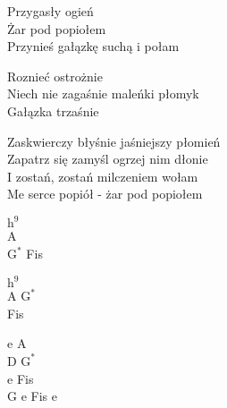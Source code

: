 \begin{text}
    Przygasły ogień\\
    Żar pod popiołem\\
    Przynieś gałązkę suchą i połam

    Roznieć ostrożnie\\
    Niech nie zagaśnie maleńki płomyk\\
    Gałązka trzaśnie

    Zaskwierczy błyśnie jaśniejszy płomień\\
    Zapatrz się zamyśl ogrzej nim dłonie\\
    I zostań, zostań milczeniem wołam\\
    Me serce popiół - żar pod popiołem
\end{text}
\begin{chord}
    $\mathrm{h^{9}}$\\
    A\\
    $\mathrm{G^{*}}$ Fis

    $\mathrm{h^{9}}$\\
    A $\mathrm{G^{*}}$\\
    Fis

    e A\\
    D $\mathrm{G^{*}}$\\
    e Fis\\
    G e Fis e

    \\
\end{chord}
